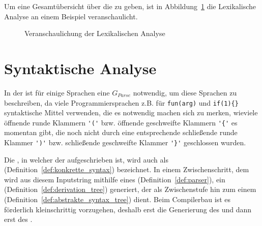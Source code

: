 Um eine Gesamtübersicht über die  zu geben, ist in Abbildung~\ref{fig:lexikalische_analyse_veranschaulichung} die Lexikalische Analyse an einem Beispiel veranschaulicht.

\begin{figure}[H]
  \hfill

  \caption{Veranschaulichung der Lexikalischen Analyse}
  \label{fig:lexikalische_analyse_veranschaulichung}
\end{figure}

\section{Syntaktische Analyse}
In der  ist für einige Sprachen eine  $G_{Parse}$ notwendig, um diese Sprachen zu beschreiben, da viele Programmiersprachen z.B. für  \verb|fun(arg)| und  \verb|if(1){}| syntaktische Mittel verwenden, die es notwendig machen sich zu merken, wieviele öffnende runde Klammern \verb|'('| bzw. öffnende geschweifte Klammern \verb|'{'| es momentan gibt, die noch nicht durch eine entsprechende schließende runde Klammer \verb|')'| bzw. schließende geschweifte Klammer \verb|'}'| geschlossen wurden.


Die , in welcher der  aufgeschrieben ist, wird auch als  (Definition~\ref{def:konkrette_syntax}) bezeichnet. In einem Zwischenschritt, dem  wird aus diesem Inputstring mithilfe eines  (Definition~\ref{def:parser}), ein  (Definition~\ref{def:derivation_tree}) generiert, der als Zwischenstufe hin zum einem  (Definition~\ref{def:abstrakte_syntax_tree}) dient. Beim Compilerbau ist es förderlich kleinschrittig vorzugehen, deshalb erst die Generierung des  und dann erst des .

